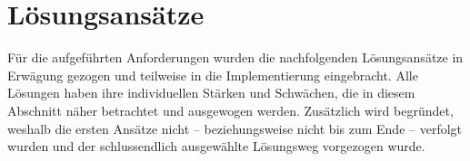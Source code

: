 \section{Lösungsansätze}
\label{sec:e_loesungsansaetze}

Für die aufgeführten Anforderungen wurden die nachfolgenden Lösungsansätze in
Erwägung gezogen und teilweise in die Implementierung eingebracht.  Alle
Lösungen haben ihre individuellen Stärken und Schwächen, die in diesem Abschnitt
näher betrachtet und ausgewogen werden.  Zusätzlich wird begründet, weshalb die
ersten Ansätze nicht -- beziehungsweise nicht bis zum Ende -- verfolgt wurden
und der schlussendlich ausgewählte Lösungsweg vorgezogen wurde.





